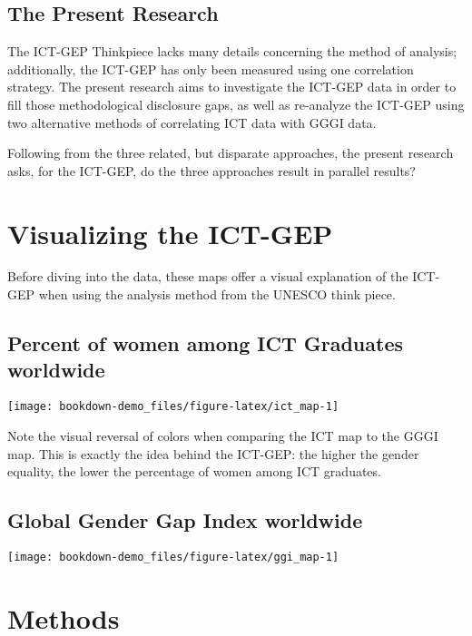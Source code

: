 \documentclass[]{book}
\begin{document}
\section{The Present Research}\label{the-present-research}

The ICT-GEP Thinkpiece lacks many details concerning the method of
analysis; additionally, the ICT-GEP has only been measured using one
correlation strategy. The present research aims to investigate the
ICT-GEP data in order to fill those methodological disclosure gaps, as
well as re-analyze the ICT-GEP using two alternative methods of
correlating ICT data with GGGI data.

Following from the three related, but disparate approaches, the present
research asks, for the ICT-GEP, do the three approaches result in
parallel results?

\chapter{Visualizing the ICT-GEP}\label{maps}

Before diving into the data, these maps offer a visual explanation of
the ICT-GEP when using the analysis method from the UNESCO think piece.

\section{Percent of women among ICT Graduates
worldwide}\label{percent-of-women-among-ict-graduates-worldwide}

\begin{center}\texttt{[image: bookdown-demo\_files/figure-latex/ict\_map-1]} \end{center}

Note the visual reversal of colors when comparing the ICT map to the
GGGI map. This is exactly the idea behind the ICT-GEP: the higher the
gender equality, the lower the percentage of women among ICT graduates.

\section{Global Gender Gap Index
worldwide}\label{global-gender-gap-index-worldwide}

\begin{center}\texttt{[image: bookdown-demo\_files/figure-latex/ggi\_map-1]} \end{center}

\chapter{Methods}\label{methods}
\end{document}
